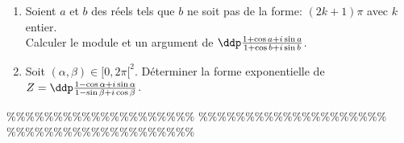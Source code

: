 



\begin{exercice}  \;
\begin{enumerate}
\item Soient $a$ et $b$ des r\'eels tels que $b$ ne soit pas de la forme: $(2k+1)\pi$ avec $k$ entier.\\
\noindent Calculer le module et un argument de $\ddp\frac{1+\cos{a}+i\sin{a}}{1+\cos{b}+i\sin{b}}$.
\item Soit $(\alpha,\beta)\in\lbrack 0,2\pi\lbrack^2$. D\'eterminer la forme exponentielle de $Z=\ddp\frac{1-\cos \alpha +i\sin \alpha }{1-\sin \beta +i\cos \beta}$.
\end{enumerate}
\end{exercice}


\%\%\%\%\%\%\%\%\%\%\%\%\%\%\%\%\%\%\%\%
\%\%\%\%\%\%\%\%\%\%\%\%\%\%\%\%\%\%\%\%
\%\%\%\%\%\%\%\%\%\%\%\%\%\%\%\%\%\%\%\%




